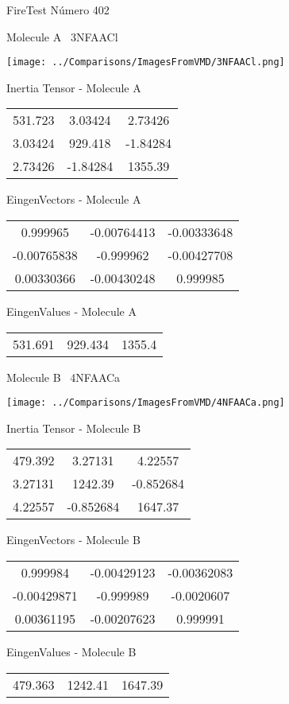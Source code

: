 \vtab[-3cm]
\begin{center}
{\large FireTest \tab Número 402}
\end{center}
\begin{multicols}{2}
\begin{center}

Molecule A \
3NFAACl

\texttt{[image: ../Comparisons/ImagesFromVMD/3NFAACl.png]}

Inertia Tensor - Molecule A \\
\begin{tabular}{|c c c|}
531.723	 & 	3.03424	 & 	2.73426	 \\
3.03424	 & 	929.418	 & 	-1.84284	 \\
2.73426	 & 	-1.84284	 & 	1355.39
\end{tabular}

\vtab
 EingenVectors - Molecule A     \\
\begin{tabular}{|c c c|}
0.999965	 & 	-0.00764413	 & 	-0.00333648	 \\
-0.00765838	 & 	-0.999962	 & 	-0.00427708	 \\
0.00330366	 & 	-0.00430248	 & 	0.999985
\end{tabular}

\vtab
 EingenValues - Molecule A     \\
\begin{tabular}{|c c c|}
531.691	 & 	929.434	 & 	1355.4	 \\
\end{tabular}
\columnbreak

Molecule B \
4NFAACa

\texttt{[image: ../Comparisons/ImagesFromVMD/4NFAACa.png]}

Inertia Tensor - Molecule B \\
\begin{tabular}{|c c c|}
479.392	 & 	3.27131	 & 	4.22557	 \\
3.27131	 & 	1242.39	 & 	-0.852684	 \\
4.22557	 & 	-0.852684	 & 	1647.37
\end{tabular}

\vtab
 EingenVectors - Molecule B     \\
\begin{tabular}{|c c c|}
0.999984	 & 	-0.00429123	 & 	-0.00362083	 \\
-0.00429871	 & 	-0.999989	 & 	-0.0020607	 \\
0.00361195	 & 	-0.00207623	 & 	0.999991
\end{tabular}

\vtab
 EingenValues - Molecule B     \\
\begin{tabular}{|c c c|}
479.363	 & 	1242.41	 & 	1647.39	 \\
\end{tabular}

\end{center}
\end{multicols}

